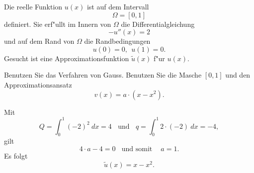Die reelle Funktion $u(x)$ ist auf dem Intervall
\[
\Omega = [0, 1]
\]
definiert. Sie erf"ullt im Innern von $\Omega$ die Differentialgleichung
\[
- u''(x) = 2
\]
und auf dem Rand von $\Omega$ die Randbedingungen
\[
u(0) = 0, \ \ u(1) = 0.
\]
Gesucht ist eine Approximationsfunktion $\tilde u(x)$ f"ur $u(x)$.

Benutzen Sie das Verfahren von Gauss. Benutzen Sie die Masche $[0,1]$
und den Approximationsansatz
\[
v(x) = a \cdot (x - x^2).
\]


\begin{loesung}
Mit
\[
Q = \int_0^1 (-2)^2 \ dx = 4 \ \ \ \ \mbox{und}  \ \ \ \ q = \int_0^1 2 \cdot (-2) \  dx = -4,
\]
gilt
\[
4 \cdot a - 4 = 0  \ \ \ \ \mbox{und somit }  \ \ \ \ a = 1.
\]
Es folgt
\[
\tilde u(x) = x - x^2.
\]
\end{loesung}
